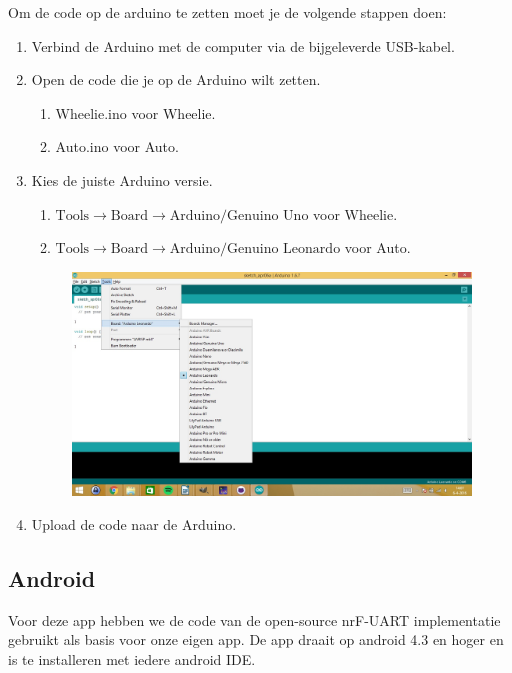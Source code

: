 \documentclass[12pt,a4paper]{article}
\begin{document}
\newpage
Om de code op de arduino te zetten moet je de volgende stappen doen:
\begin{enumerate}
	\item Verbind de Arduino met de computer via de bijgeleverde USB-kabel.
	\item Open de code die je op de Arduino wilt zetten.
		\begin{enumerate}
			\item Wheelie.ino voor Wheelie.
			\item Auto.ino voor Auto.
		\end{enumerate}
	\item Kies de juiste Arduino versie.  
	\begin{enumerate}
		\item $ \text{Tools} \rightarrow \text{Board} \rightarrow \text{Arduino/Genuino Uno} $ voor Wheelie.
		\item $  \text{Tools} \rightarrow \text{Board} \rightarrow \text{Arduino/Genuino Leonardo} $ voor Auto.
	\end{enumerate}	
	\begin{figure}[h]
		\centering
		\includegraphics[width=0.7\linewidth]{board_selecteren}
		\label{fig:board_selecteren}
	\end{figure}
	\item Upload de code naar de Arduino.		
\end{enumerate}

\subsection{Android}
Voor deze app hebben we de code van de open-source nrF-UART implementatie \cite{nrf_ua} gebruikt als basis voor onze eigen app. 
De app draait op android 4.3 en hoger en is te installeren met iedere android IDE. 
\end{document}
